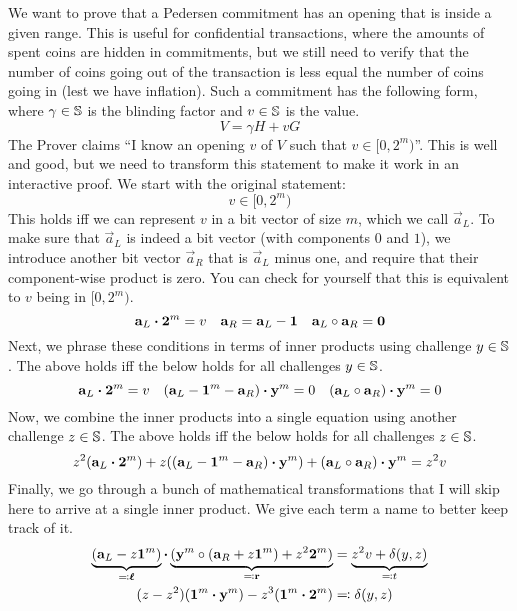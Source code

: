 We want to prove that a Pedersen commitment has an opening that is inside a given range.
This is useful for confidential transactions,
where the amounts of spent coins are hidden in commitments,
but we still need to verify that the number of coins going out of the transaction is less equal the number of coins going in (lest we have inflation).
%
Such a commitment has the following form,
where $\gamma \in \mathbb{S}$ is the blinding factor and $v \in \mathbb{S}$ is the value.
\[
    V = \gamma H + vG
\]
%
The Prover claims \enquote{I know an opening $v$ of $V$ such that $v \in [0, 2^m)$}.
%
This is well and good,
but we need to transform this statement to make it work in an interactive proof.
We start with the original statement:
%
\[
    v \in [0, 2^m)
\]
%
This holds iff we can represent $v$ in a bit vector of size $m$,
which we call $\vec{a}_L$.
To make sure that $\vec{a}_L$ is indeed a bit vector (with components $0$ and $1$),
we introduce another bit vector $\vec{a}_R$ that is $\vec{a}_L$ minus one,
and require that their component-wise product is zero.
You can check for yourself that this is equivalent to $v$ being in $[0, 2^m)$.
%
\[
    \mathbf{a}_L \boldsymbol{\cdot} \mathbf{2}^m = v \quad
    \mathbf{a}_R = \mathbf{a}_L - \mathbf{1} \quad
    \mathbf{a}_L \circ \mathbf{a}_R = \mathbf{0}
\]
%
Next,
we phrase these conditions in terms of inner products
using challenge $y \in \mathbb{S}$.
The above holds iff the below holds for all challenges $y \in \mathbb{S}$.
%
\[
    \mathbf{a}_L \boldsymbol{\cdot} \mathbf{2}^m = v \quad
    (\mathbf{a}_L - \mathbf{1}^m - \mathbf{a}_R) \boldsymbol{\cdot} \mathbf{y}^m = 0 \quad
    (\mathbf{a}_L \circ \mathbf{a}_R) \boldsymbol{\cdot} \mathbf{y}^m = 0
\]
%
Now,
we combine the inner products into a single equation
using another challenge $z \in \mathbb{S}$.
The above holds iff the below holds for all challenges $z \in \mathbb{S}$.
\[
    z^2 (\mathbf{a}_L \boldsymbol{\cdot} \mathbf{2}^m) + z((\mathbf{a}_L - \mathbf{1}^m - \mathbf{a}_R) \boldsymbol{\cdot} \mathbf{y}^m) + (\mathbf{a}_L \circ \mathbf{a}_R) \boldsymbol{\cdot} \mathbf{y}^m = z^2v
\]
%
Finally,
we go through a bunch of mathematical transformations that I will skip here to arrive at a single inner product.
We give each term a name to better keep track of it.
%
\begin{align*}
    \underbrace{(\mathbf{a}_L - z \mathbf{1}^m)}_{\eqqcolon \mathbf{\boldsymbol{\ell}}} \boldsymbol{\cdot} \underbrace{(\mathbf{y}^m \circ (\mathbf{a}_R + z \mathbf{1}^m) + z^2 \mathbf{2}^m)}_{\eqqcolon \mathbf{r}}
    &= \underbrace{z^2v + \delta(y, z)}_{\eqqcolon t} \\
    (z - z^2)(\mathbf{1}^m \boldsymbol{\cdot} \mathbf{y}^m) - z^3 (\mathbf{1}^m \boldsymbol{\cdot} \mathbf{2}^m) &\eqqcolon \delta(y, z)
\end{align*}
